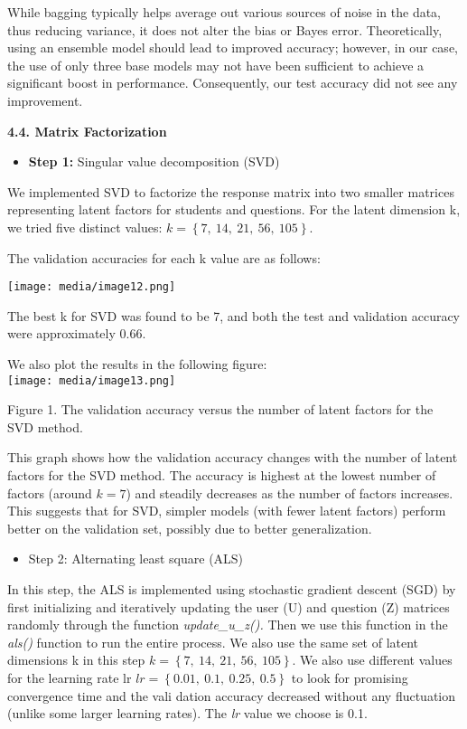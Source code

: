 While bagging typically helps average out various sources of noise in
the data, thus reducing variance, it does not alter the bias or Bayes
error. Theoretically, using an ensemble model should lead to improved
accuracy; however, in our case, the use of only three base models may
not have been sufficient to achieve a significant boost in performance.
Consequently, our test accuracy did not see any improvement.

\textbf{4.4. Matrix Factorization}

\begin{itemize}
\item
  \textbf{Step 1:} Singular value decomposition (SVD)
\end{itemize}

We implemented SVD to factorize the response matrix into two smaller
matrices representing latent factors for students and questions. For the
latent dimension k, we tried five distinct values:
\(k = \left\{ 7,\ 14,\ 21,\ 56,\ 105 \right\}\).

The validation accuracies for each k value are as follows:

\texttt{[image: media/image12.png]}

The best k for SVD was found to be 7, and both the test and validation
accuracy were approximately 0.66.

We also plot the results in the following figure:\\
\texttt{[image: media/image13.png]}

Figure 1. The validation accuracy versus the number of latent factors
for the SVD method.

This graph shows how the validation accuracy changes with the number of
latent factors for the SVD method. The accuracy is highest at the lowest
number of factors (around \(k = 7\)) and steadily decreases as the
number of factors increases. This suggests that for SVD, simpler models
(with fewer latent factors) perform better on the validation set,
possibly due to better generalization.

\begin{itemize}
\item
  Step 2: Alternating least square (ALS)
\end{itemize}

In this step, the ALS is implemented using stochastic gradient descent
(SGD) by first initializing and iteratively updating the user (U) and
question (Z) matrices randomly through the function
\emph{update\_u\_z().} Then we use this function in the \emph{als()}
function to run the entire process. We also use the same set of latent
dimensions k in this step
\(k = \left\{ 7,\ 14,\ 21,\ 56,\ 105 \right\}\). We also use different
values for the learning rate lr
\(lr = \left\{ 0.01,\ 0.1,\ 0.25,\ 0.5 \right\}\) to look for promising
convergence time and the vali dation accuracy decreased without any
fluctuation (unlike some larger learning rates). The \emph{lr} value we
choose is 0.1.

